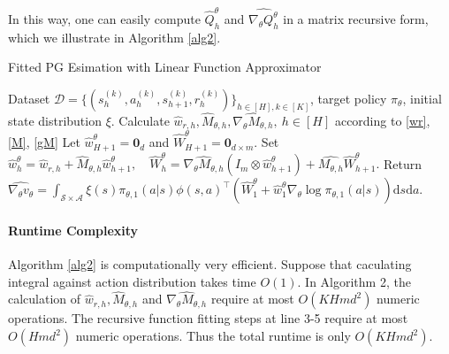 \documentclass{article}
\numberwithin{equation}{section}
\begin{document}
In this way, one can easily compute $\widehat{Q}_h^\theta$ and $\widehat{\nabla_\theta Q_h^\theta}$ in a matrix recursive form, which we illustrate in Algorithm \ref{alg2}.
\begin{algorithm}[htb!]
\caption{Fitted PG Esimation with Linear Function Approximator}
\label{alg2}
	\begin{algorithmic}[1] 
		\Require Dataset $\mathcal{D}=\{(s_h^{(k)},a_h^{(k)},s^{(k)}_{h+1},r_h^{(k)})\}_{h\in[H],k\in[K]}$, target policy $\pi_\theta$, initial state distribution $\xi$.
		\State Calculate $\widehat{w}_{r,h}, \widehat{M}_{\theta,h}, \widehat{\nabla_\theta M_{\theta,h}},\ h\in[H]$ according to \eqref{wr}, \eqref{M}, \eqref{gM}
		\State Let $\widehat{w}_{H+1}^\theta=\bm{0}_d$ and $\widehat{W}_{H+1}^\theta=\bm{0}_{d\times m}.$
		\State Set $\widehat{w}_h^{\theta}=\widehat{w}_{r,h}+\widehat{M}_{\theta,h}\widehat{w}_{h+1}^\theta, \quad\widehat{W}^\theta_h=\widehat{\nabla_\theta M_{\theta,h}}(I_m\otimes\widehat{w}_{h+1}^\theta)+\widehat{M_{\theta,h}}\widehat{W}^\theta_{h+1}.$
		\EndFor
		\State Return
$
\widehat{\nabla_\theta v_\theta}=\int_{\mathcal{S}\times\mathcal{A}}\xi(s)\pi_{\theta,1}(a\vert s)\phi(s,a)^\top\left(\widehat{W}_1^\theta+\widehat{w}_1^\theta\nabla_\theta\log\pi_{\theta,1}(a\vert s)\right)\mathrm{d}s \mathrm{d}a.
$
	\end{algorithmic}
\end{algorithm}
\paragraph{Runtime Complexity} Algorithm \ref{alg2} is computationally very efficient. Suppose that caculating integral against action distribution takes time $O(1)$. In Algorithm 2, the calculation of $\widehat{w}_{r,h}, \widehat{M}_{\theta,h}$ and $\widehat{\nabla_\theta M_{\theta,h}}$ require at most $O(KHmd^2)$ numeric operations. The recursive function fitting steps at line 3-5 require at most $O(Hmd^2)$ numeric operations. Thus the total runtime is only $O(KHmd^2)$. 
\end{document}

